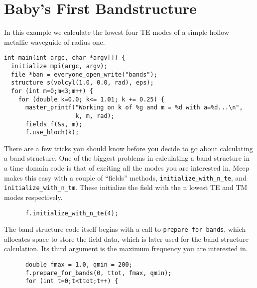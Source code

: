 \begin{comment}
/*
\end{comment}
\section{Baby's First Bandstructure}
\begin{comment}
*/
\end{comment}

\begin{comment}
#include <stdio.h>
#include <stdlib.h>
#include <meep.h>
using namespace meep;

double eps(const vec &) {
  return 1.0;
}
const int rad = 10;
const int ttot = 1500*rad;
\end{comment}

In this example we calculate the lowest four TE modes of a simple hollow
metallic waveguide of radius one.

\begin{verbatim}
int main(int argc, char *argv[]) {
  initialize mpi(argc, argv);
  file *ban = everyone_open_write("bands");
  structure s(volcyl(1.0, 0.0, rad), eps);
  for (int m=0;m<3;m++) {
    for (double k=0.0; k<= 1.01; k += 0.25) {
      master_printf("Working on k of %g and m = %d with a=%d...\n",
                    k, m, rad);
      fields f(&s, m);
      f.use_bloch(k);
\end{verbatim}

There are a few tricks you should know before you decide to go about
calculating a band structure.  One of the biggest problems in calculating a
band structure in a time domain code is that of exciting all the modes you
are interested in.  Meep makes this easy with a couple of ``fields''
methods, \verb-initialize_with_n_te-, and \verb-initialize_with_n_tm-.
These initialize the field with the n lowest TE and TM modes respectively.

\begin{verbatim}
      f.initialize_with_n_te(4);
\end{verbatim}

The band structure code itself begins with a call to
\verb-prepare_for_bands-, which allocates space to store the field
data, which is later used for the band structure calculation.  Its third
argument is the maximum frequency you are interested in.

\begin{verbatim}
      double fmax = 1.0, qmin = 200;
      f.prepare_for_bands(0, ttot, fmax, qmin);
      for (int t=0;t<ttot;t++) {
\end{verbatim}


